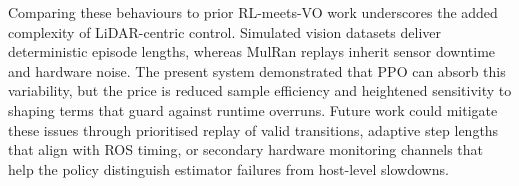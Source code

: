 Comparing these behaviours to prior RL-meets-VO work underscores the added complexity of LiDAR-centric control. Simulated vision datasets deliver deterministic episode lengths, whereas MulRan replays inherit sensor downtime and hardware noise. The present system demonstrated that PPO can absorb this variability, but the price is reduced sample efficiency and heightened sensitivity to shaping terms that guard against runtime overruns. Future work could mitigate these issues through prioritised replay of valid transitions, adaptive step lengths that align with ROS timing, or secondary hardware monitoring channels that help the policy distinguish estimator failures from host-level slowdowns.
